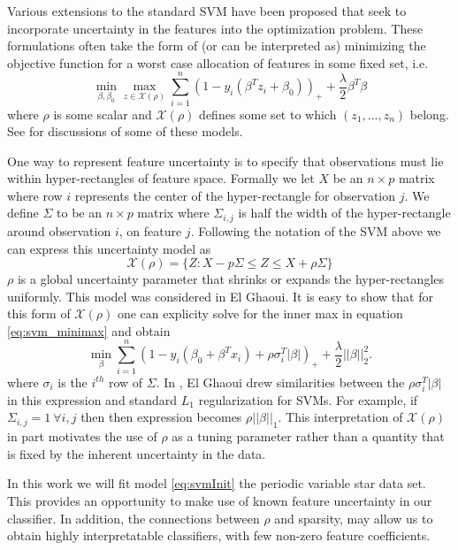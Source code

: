 \documentclass[10pt]{article}
\theoremstyle{definition}
\begin{document}
Various extensions to the standard SVM have been proposed that seek to incorporate uncertainty in the features into the optimization problem. These formulations often take the form of (or can be interpreted as) minimizing the objective function for a worst case allocation of features in some fixed set, i.e.
\begin{equation}
\label{eq:svm_minimax}
\min_{\beta,\beta_0}  \max_{z \in \mathcal{X}(\rho)} \sum_{i=1}^n (1 - y_i(\beta^Tz_i + \beta_0))_{+} + \frac{\lambda}{2}\beta^T\beta
\end{equation}
where $\rho$ is some scalar and $\mathcal{X}(\rho)$ defines some set to which $(z_1, \ldots, z_n)$ belong. See \cite{bhattacharyya2004robust,shivaswamy2006second,ben2011chance} for discussions of some of these models.

One way to represent feature uncertainty is to specify that observations must lie within hyper-rectangles of feature space. Formally we let $X$ be an $n \times p$ matrix where row $i$ represents the center of the hyper-rectangle for observation $j$. We define $\Sigma$ to be an $n \times p$ matrix where $\Sigma_{i,j}$ is half the width of the hyper-rectangle around observation $i$, on feature $j$. Following the notation of the SVM above we can express this uncertainty model as
\begin{equation}
\mathcal{X}(\rho) = \{Z : X - p\Sigma \leq Z \leq X + \rho \Sigma\}
\end{equation}
$\rho$ is a global uncertainty parameter that shrinks or expands the hyper-rectangles uniformly. This model was considered in El Ghaoui\cite{el2003robust}. It is easy to show that for this form of $\mathcal{X}(\rho)$ one can explicity solve for the inner max in equation \eqref{eq:svm_minimax} and obtain
\begin{equation}
\label{eq:svmInit}
\min_{\beta}\sum_{i=1}^n(1-y_i(\beta_0+\beta^Tx_i)+\rho\sigma_i^T|\beta|)_++\frac{\lambda}{2} ||\beta||_2^2.
\end{equation}
where $\sigma_i$ is the $i^{th}$ row of $\Sigma$. In \cite{el2003robust}, El Ghaoui drew similarities between the $\rho\sigma_i^T|\beta|$ in this expression and standard $L_1$ regularization for SVMs. For example, if $\Sigma_{i,j} = 1 \ \forall i,j$ then then expression becomes $\rho||\beta||_1$. This interpretation of $\mathcal{X}(\rho)$ in part motivates the use of $\rho$ as a tuning parameter rather than a quantity that is fixed by the inherent uncertainty in the data.

In this work we will fit model \eqref{eq:svmInit} the periodic variable star data set. This provides an opportunity to make use of known feature uncertainty in our classifier. In addition, the connections between $\rho$ and sparsity, may allow us to obtain highly interpretatable classifiers, with few non-zero feature coefficients.
\end{document}
